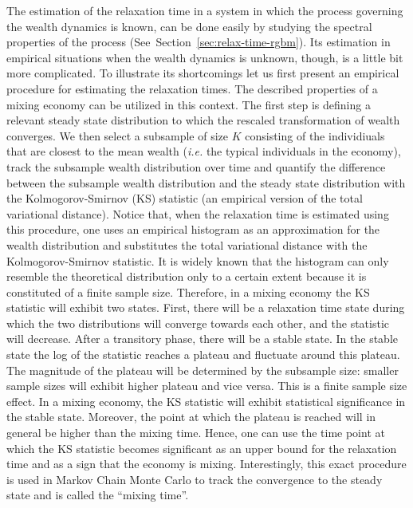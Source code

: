 \documentclass[11pt]{article}
\newcommand{\Sref}[1]{Section~\ref{sec:#1}}
\newcommand{\ie}{{\it i.e.}\xspace}
\numberwithin{equation}{section}
\begin{document}
The estimation of the relaxation time in a system in which the process governing the wealth dynamics is known, can be done easily by studying the spectral properties of the process (See~\Sref{relax-time-rgbm}). Its estimation in empirical situations when the wealth dynamics is unknown, though, is a little bit more complicated. To illustrate its shortcomings let us first present an empirical procedure for estimating the relaxation times. The described properties of a mixing economy can be utilized in this context. The first step is defining a relevant steady state distribution to which the rescaled transformation of wealth converges. We then select a subsample of size $K$ consisting of the individiuals that are closest to the mean wealth (\ie the typical individuals in the economy), track the subsample wealth distribution over time and quantify the difference between the subsample wealth distribution and the steady state distribution with the Kolmogorov-Smirnov (KS) statistic (an empirical version of the total variational distance). Notice that, when the relaxation time is estimated using this procedure, one uses an empirical histogram as an approximation for the wealth distribution and substitutes the total variational distance with the Kolmogorov-Smirnov  statistic. It is widely known that the histogram can only resemble the theoretical distribution only to a certain extent because it is constituted of a finite sample size. Therefore, in a mixing economy the KS statistic will exhibit two states. First, there will be a relaxation time state during which the two distributions will converge towards each other, and the statistic will decrease. After a transitory phase, there will be a stable state. In the stable state the log of the statistic reaches a plateau and fluctuate around this plateau. The magnitude of the plateau will be determined by the subsample size: smaller sample sizes will exhibit higher plateau and vice versa. This is a finite sample size effect. In a mixing economy, the KS statistic will exhibit statistical significance in the stable state. Moreover, the point at which the plateau is reached will in general be higher than the mixing time. Hence, one can use the time point at which the KS statistic becomes significant as an upper bound for the relaxation time and as a sign that the economy is mixing. Interestingly, this exact procedure is used in Markov Chain Monte Carlo to track the convergence to the steady state and is called the ``mixing time''. 
\end{document}
